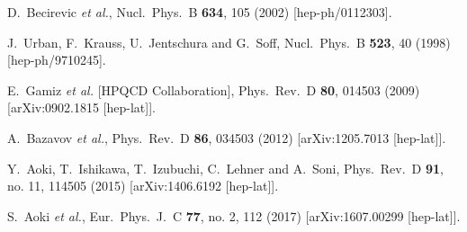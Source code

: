\documentclass[prd,preprint,superscriptaddress,amsmath,amssymb]{revtex4}
\begin{document}
\begin{thebibliography}{100}
  D.~Becirevic {\it et al.},
  Nucl.\ Phys.\ B {\bf 634}, 105 (2002)
  [hep-ph/0112303].




  J.~Urban, F.~Krauss, U.~Jentschura and G.~Soff,
  Nucl.\ Phys.\ B {\bf 523}, 40 (1998)
  [hep-ph/9710245].
  
  E.~Gamiz {\it et al.} [HPQCD Collaboration],
  Phys.\ Rev.\ D {\bf 80}, 014503 (2009)
  [arXiv:0902.1815 [hep-lat]].
  
  
  A.~Bazavov {\it et al.},
  Phys.\ Rev.\ D {\bf 86}, 034503 (2012)
  [arXiv:1205.7013 [hep-lat]].
 
  Y.~Aoki, T.~Ishikawa, T.~Izubuchi, C.~Lehner and A.~Soni,
  Phys.\ Rev.\ D {\bf 91}, no. 11, 114505 (2015)
  [arXiv:1406.6192 [hep-lat]].

  S.~Aoki {\it et al.},
  Eur.\ Phys.\ J.\ C {\bf 77}, no. 2, 112 (2017)
  [arXiv:1607.00299 [hep-lat]].



\end{thebibliography}
\end{document}
